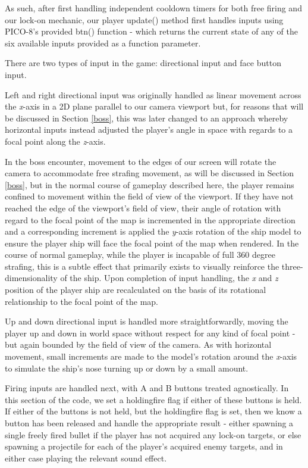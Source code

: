 \documentclass[11pt]{article}
\begin{document}
As such, after first handling independent cooldown timers for both free firing and our lock-on mechanic,
our player update() method first handles inputs using PICO-8's provided btn() function - which returns
the current state of any of the six available inputs provided as a function parameter.

There are two types of input in the game: directional input and face button input.

Left and right
directional input was originally handled as linear movement across the \textit{x}-axis in a 2D plane
parallel to our camera viewport but, for reasons that will be discussed in Section \ref{boss}, this
was later changed to an approach whereby horizontal inputs instead adjusted the player's angle
in space with regards to a focal point along the \textit{z}-axis.

In the boss encounter, movement to the
edges of our screen will rotate the camera to accommodate free strafing movement, as will be discussed in
Section \ref{boss}, but in the normal course of gameplay described here, the player remains confined to
movement within the field of view of the viewport. If they have not reached the edge of the viewport's
field of view, their angle of rotation with regard to the focal point of the map is incremented in the
appropriate direction and a corresponding increment is applied the \textit{y}-axis rotation of the
ship model to ensure the player ship will face the focal point of the map when rendered. In the course
of normal gameplay, while the player is incapable of full 360 degree strafing, this is a subtle effect
that primarily exists to visually reinforce the three-dimensionality of the ship. Upon completion of
input handling, the \textit{x} and \textit{z} position of the player ship are recalculated on the basis 
of its rotational relationship to the focal point of the map.

Up and down directional input is handled more straightforwardly, moving the player up and down in world
space without respect for any kind of focal point - but again bounded by the field of view of the
camera. As with horizontal movement, small increments are made to the model's rotation around the
\textit{x}-axis to simulate the ship's nose turning up or down by a small amount.

Firing inputs are handled next, with A and B buttons treated agnostically. In this section of the
code, we set a holding\textunderscore fire flag if either of these buttons is held. If either of the
buttons is not held, but the holding\textunderscore fire flag is set, then we know a button has
been released and handle the appropriate result - either spawning a single freely fired bullet
if the player has not acquired any lock-on targets, or else spawning a projectile for each of 
the player's acquired enemy targets, and in either case playing the relevant sound effect.
\end{document}
